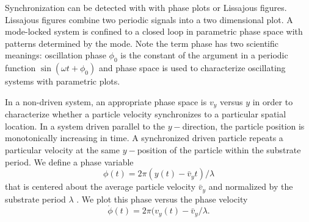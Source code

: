 \documentclass[twocolumn,preprintnumbers,amsmath,amssymb,aps,prx]{revtex4}
\begin{document}
  Synchronization 
  can be detected with 
  with phase
  plots or Lissajous figures.
  Lissajous figures
  combine two periodic signals
  into a two dimensional plot.  
  A mode-locked system is confined to 
  a closed loop in  
  parametric phase space %
  with patterns determined by the mode. %
  Note the term phase
  has two scientific meanings:  
  oscillation phase $\phi_0$ is the constant of the argument
  in a periodic function
  $\sin{(\omega t + \phi_0)}$ and phase space is
  used to characterize oscillating systems with
  parametric plots.
  
  In a non-driven system, an appropriate
  phase space is $v_y$ versus $y$
  in order to characterize whether a particle velocity
  synchronizes to a particular spatial location.
  In a system driven parallel to the $y-$direction,
  the particle position is monotonically increasing
  in time.
  A synchronized driven particle
  repeats a particular velocity
  at the same $y-$position of the particle
  within the substrate period.
  We define a phase variable 
  \begin{equation}
    \phi(t) = 2\pi(y(t)-\bar{v}_y t)/\lambda
  \end{equation}
  that is centered about the average particle velocity $\bar{v}_y$
  and normalized by the substrate period $\lambda$ \cite{Juniper2015}.
  We plot this phase
  versus the phase velocity 
  \begin{equation}
    \dot{\phi}(t) = 2\pi(v_y(t)-\bar{v}_y/\lambda.
  \end{equation}
  
\end{document}

